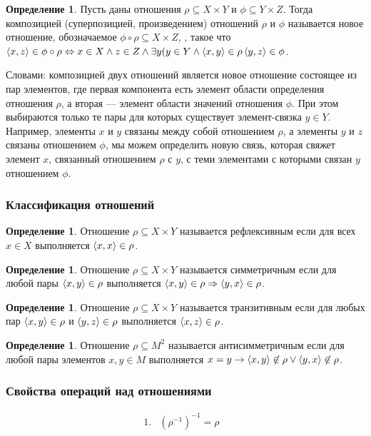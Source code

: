 \documentclass[letterpaper, 10pt]{article}
\theoremstyle{definition}
\newtheorem{define}[thm]{Определение}
\begin{document}
	\begin{define}
		Пусть даны отношения $\rho \subseteq X \times Y$ и $\phi \subseteq Y
		\times Z$. Тогда композицией (суперпозицией, произведением) отношений
		$\rho$ и $\phi$ называется новое отношение, обозначаемое $\phi \circ
		\rho \subseteq X \times Z$,
		, такое что $\left< x,z \right> \in \phi \circ \rho
		\Leftrightarrow x\in X \land z \in Z \land \exists y(y \in Y \land 
		\left< x,y \right> \in \rho \left< y,z \right> \in \phi$.
	\end{define}

	Словами: композицией двух отношений является новое отношение состоящее из
	пар элементов, где первая компонента есть элемент области определения
	отношения $\rho$, а вторая --- элемент области значений отношения $\phi$.
	При этом выбираются только те пары для которых существует элемент-связка $y
	\in Y$. Например, элементы $x$ и $y$ связаны между собой отношением $\rho$,
	а элементы $y$ и $z$ связаны отношением $\phi$, мы можем определить новую
	связь, которая свяжет элемент $x$, связанный отношением $\rho$ с $y$, с теми
	элементами с которыми связан $y$ отношением $\phi$.
	
	\subsubsection{Классификация отношений}

	\begin{define}
		Отношение $\rho \subseteq X \times Y$ называется рефлексивным если для
		всех $x \in X$ выполняется $\left< x,x \right> \in \rho$.
	\end{define}

	\begin{define}
		Отношение $\rho \subseteq X \times Y$ называется симметричным если 
		для любой пары $\left< x,y \right> \in \rho$ выполняется $\left< x,y \right> \in \rho
		\Rightarrow \left< y,x \right> \in \rho$.
	\end{define}

	\begin{define}
		Отношение $\rho \subseteq X \times Y$ называется транзитивным если 
		для любых пар $\left< x,y \right> \in \rho$ и $\left< y,z \right> \in \rho$ выполняется 
		$\left< x,z \right> \in \rho$.
	\end{define}

	\begin{define}
		Отношение $\rho \subseteq M^2$ называется антисимметричным если 
		для любой пары элементов $x,y \in M$ выполняется $x = y \rightarrow
		\left< x,y \right> \not\in \rho \lor \left< y,x \right> \not\in \rho$.
	\end{define}

	\subsubsection{Свойства операций над отношениями}
	\[
	\begin{array}{lrr}
		1. & (\rho^{-1})^{-1}=\rho & \text{} \\	
	\end{array}
\]
\end{document}
